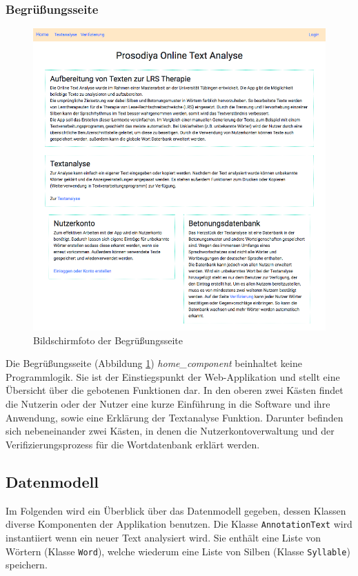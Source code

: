 \subsubsection{Begrüßungsseite}

\begin{figure}[h!]
	\centering
	\includegraphics[width=.6\linewidth, frame]{figures/frontend/home}
	\caption{Bildschirmfoto der Begrüßungsseite}
	\label{fig:frontend-home}
\end{figure}

Die Begrüßungsseite (Abbildung \ref{fig:frontend-home}) \textit{home\_component} beinhaltet keine Programmlogik. Sie ist der Einstiegspunkt der Web-Applikation und stellt eine Übersicht über die gebotenen Funktionen dar. In den oberen zwei Kästen findet die Nutzerin oder der Nutzer eine kurze Einführung in die Software und ihre Anwendung, sowie eine Erklärung der Textanalyse Funktion. Darunter befinden sich nebeneinander zwei Kästen, in denen die Nutzerkontoverwaltung und der Verifizierungsprozess für die Wortdatenbank erklärt werden.

\subsection{Datenmodell}

Im Folgenden wird ein Überblick über das Datenmodell gegeben, dessen Klassen diverse Komponenten der Applikation benutzen. Die Klasse \texttt{AnnotationText} wird instantiiert wenn ein neuer Text analysiert wird. Sie
enthält eine Liste von Wörtern (Klasse \texttt{Word}), welche wiederum eine Liste von Silben (Klasse \texttt{Syllable}) speichern. \\


